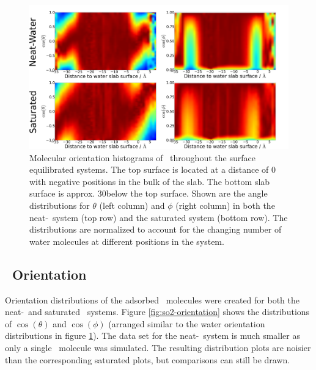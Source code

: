 \begin{figure}[h!]
	\begin{center}
		\includegraphics[scale=1.0]{images/h2o-angles/h2oangles.png}
		\caption{Molecular orientation histograms of \wat~throughout the surface equilibrated systems. The top surface is located at a distance of 0 with negative positions in the bulk of the slab. The bottom slab surface is approx. 30\angs below the top surface. Shown are the angle distributions for $\theta$ (left column) and $\phi$ (right column) in both the neat-\wat~system (top row) and the saturated system (bottom row). The distributions are normalized to account for the changing number of water molecules at different positions in the system.}
		\label{fig:water-orientation}
	\end{center}
\end{figure}



\subsection{\suldiox~Orientation}

Orientation distributions of the adsorbed \suldiox~molecules were created for both the neat-\wat~and saturated \suldiox~systems. Figure \ref{fig:so2-orientation} shows the distributions of $\cos(\theta)$ and $\cos(\phi)$ (arranged similar to the water orientation distributions in figure \ref{fig:water-orientation}). The data set for the neat-\wat~system is much smaller as only a single \suldiox~molecule was simulated. The resulting distribution plots are noisier than the corresponding saturated plots, but comparisons can still be drawn.

